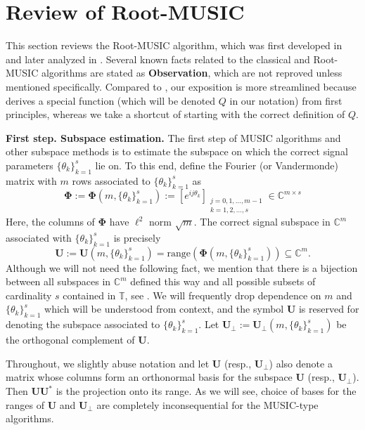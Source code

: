 \documentclass[11pt]{article}
\theoremstyle{definition}
\numberwithin{theorem}{section}
\numberwithin{equation}{section}
\def\C{\mathbb{C}}
\def\T{\mathbb{T}}
\renewcommand{\subset}{\subseteq}
\newcommand{\bfU}{{\boldsymbol U}}
\newcommand{\bfPhi}{{\boldsymbol \Phi}}
\numberwithin{equation}{section}
\begin{document}
\section{Review of Root-MUSIC}
\label{sec:review} 

This section reviews the Root-MUSIC algorithm, which was first developed in \cite{barabell1983improving} and later analyzed in \cite{rao1989performance,krim1992operator}. Several known facts related to the classical and Root-MUSIC algorithms are stated as {\bf Observation}, which are not reproved unless  mentioned specifically. Compared to \cite{rao1989performance}, our exposition is more streamlined because \cite{rao1989performance} derives a special function (which will be denoted $Q$ in our notation) from first principles, whereas we take a shortcut of starting with the correct definition of $Q$.

{\bf First step. Subspace estimation.} The first step of MUSIC algorithms and other subspace methods is to estimate the subspace on which the correct signal parameters $\{\theta_k\}_{k=1}^s$ lie on. To this end, define the Fourier (or Vandermonde) matrix with $m$ rows associated to $\{\theta_k\}_{k=1}^s$ as
$$
\bfPhi:=\bfPhi(m,\{\theta_k\}_{k=1}^s) 
:= \left[ e^{i j \theta_k} \right]_{\substack{j=0,1,\dots,m-1 \\ k=1,2,\dots,s}}
\in \C^{m\times s}
$$
Here, the columns of $\bfPhi$ have $\ell^2$ norm $\sqrt m$. The correct signal subspace in $\C^m$ associated with $\{\theta_k\}_{k=1}^s$ is precisely
$$
\bfU:=\bfU(m,\{\theta_k\}_{k=1}^s)=\text{range}(\bfPhi(m,\{\theta_k\}_{k=1}^s))\subset \C^m. 
$$
Although we will not need the following fact, we mention that there is a bijection between all subspaces in $\C^m$ defined this way and all possible subsets of cardinality $s$ contained in $\T$, see \cite[Lemma 5.3]{fannjiang2025optimality}. We will frequently drop dependence on $m$ and $\{\theta_k\}_{k=1}^s$ which will be understood from context, and the symbol $\bfU$ is reserved for denoting the subspace associated to $\{\theta_k\}_{k=1}^s$. Let $\bfU_\perp:=\bfU_\perp(m,\{\theta_k\}_{k=1}^s)$ be the orthogonal complement of $\bfU$. 

Throughout, we slightly abuse notation and let $\bfU$ (resp., $\bfU_\perp$) also denote a matrix whose columns form an orthonormal basis for the subspace $\bfU$ (resp., $\bfU_\perp$). Then $\bfU\bfU^*$ is the projection onto its range. As we will see, choice of bases for the ranges of $\bfU$ and $\bfU_\perp$ are completely inconsequential for the MUSIC-type algorithms.
\end{document}
